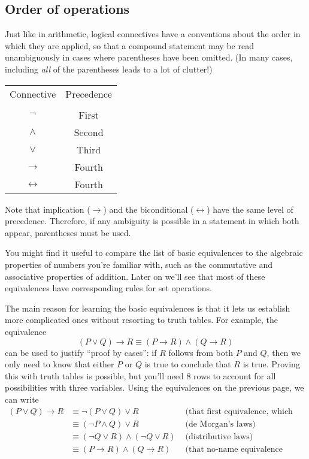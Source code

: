 \documentclass[letterpaper,12pt]{article}
\begin{document}
\subsection*{Order of operations}
Just like in arithmetic, logical connectives have a conventions about the order in which they are applied, so that a compound statement may be read unambiguously in cases where parentheses have been omitted.  (In many cases, including {\em all} of the parentheses leads to a lot of clutter!)

\bigskip

\begin{tabular}{cc}
 Connective & Precedence \\
& \\
$\neg$ & First\\
$\wedge$ & Second\\
$\vee$ & Third\\
$\rightarrow$ & Fourth\\
$\leftrightarrow$ & Fourth
\end{tabular}

\bigskip

Note that implication ($\rightarrow$) and the biconditional ($\leftrightarrow$) have the same level of precedence.  Therefore, if any ambiguity is possible in a statement in which both appear, parentheses must be used.

You might find it useful to compare the list of basic equivalences to the algebraic properties of numbers you're familiar with, such as the commutative and associative properties of addition. Later on we'll see that most of these equivalences have corresponding rules for set operations.

The main reason for learning the basic equivalences is that it lets us establish more complicated ones without resorting to truth tables. For example, the equivalence 
\[
 (P\vee Q)\to R \equiv (P\to R)\wedge (Q\to R)
\]
can be used to justify ``proof by cases'': if $R$ follows from both $P$ and $Q$, then we only need to know that either $P$ or $Q$ is true to conclude that $R$ is true. Proving this with truth tables is possible, but you'll need 8 rows to account for all possibilities with three variables. Using the equivalences on the previous page, we can write
\begin{align*}
 (P\vee Q)\to R &\equiv \neg(P\vee Q)\vee R &\text{ (that first equivalence, which needs a name)}\\
&\equiv (\neg P\wedge Q)\vee R &\text{ (de Morgan's laws)}\\
&\equiv (\neg Q\vee R)\wedge (\neg Q\vee R) &\text{ (distributive laws)}\\
&\equiv (P\to R)\wedge (Q\to R) &\text{ (that no-name equivalence again)}
\end{align*}
\end{document}
